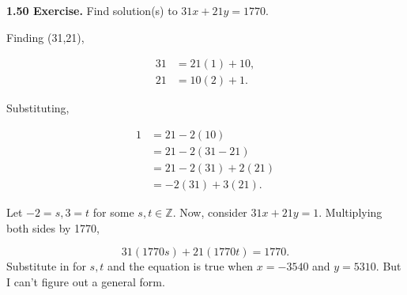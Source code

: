 \documentclass[12pt]{article}
\begin{document}
\noindent\textbf{1.50 Exercise.} Find solution(s) to $31x+21y=1770$.

\bigskip

\noindent Finding (31,21),

\begin{align*}
31 &= 21(1) + 10, \\
21 &= 10(2) +1.
\end{align*}

\noindent Substituting,

\begin{align*}
1 &= 21 - 2(10) \\
&= 21 - 2(31 - 21) \\
&= 21 - 2(31) + 2(21) \\
&= - 2(31) + 3(21).
\end{align*}

\noindent Let $-2=s,3=t$ for some $s,t\in\mathbb{Z}$. Now, consider $31x+21y=1$. Multiplying both sides by 1770, 

\begin{equation*}
31(1770s)+21(1770t)=1770.
\end{equation*} Substitute in for $s,t$ and the equation is true when $x=-3540$ and $y=5310$. But I can't figure out a general form.
\end{document}
